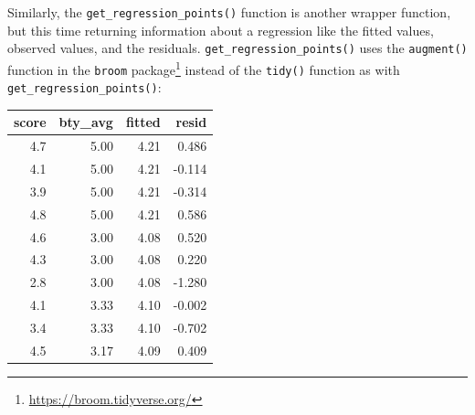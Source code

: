 \documentclass[12pt, krantz2,]{krantz}
\makeatletter
\newenvironment{Shaded}{\begin{snugshade}}{\end{snugshade}}
\newcommand{\DataTypeTok}[1]{\textcolor[rgb]{0.27,0.27,0.27}{#1}}
\newcommand{\DecValTok}[1]{\textcolor[rgb]{0.06,0.06,0.06}{#1}}
\newcommand{\KeywordTok}[1]{\textcolor[rgb]{0.27,0.27,0.27}{\textbf{#1}}}
\newcommand{\NormalTok}[1]{#1}
\newcommand{\OperatorTok}[1]{\textcolor[rgb]{0.43,0.43,0.43}{\textbf{#1}}}
\newcommand{\StringTok}[1]{\textcolor[rgb]{0.5,0.5,0.5}{#1}}
\renewcommand{\href}[2]{#2\footnote{\url{#1}}}
\newenvironment{kframe}{%
\medskip{}
\setlength{\fboxsep}{.8em}
 \def\at@end@of@kframe{}%
 \ifinner\ifhmode%
  \def\at@end@of@kframe{\end{minipage}}%
  \begin{minipage}{\columnwidth}%
 \fi\fi%
 \def\FrameCommand##1{\hskip\@totalleftmargin \hskip-\fboxsep
 \colorbox{shadecolor}{##1}\hskip-\fboxsep
     \hskip-\linewidth \hskip-\@totalleftmargin \hskip\columnwidth}%
 \MakeFramed {\advance\hsize-\width
   \@totalleftmargin\z@ \linewidth\hsize
   \@setminipage}}%
 {\par\unskip\endMakeFramed%
 \at@end@of@kframe}
\renewenvironment{Shaded}{\begin{kframe}}{\end{kframe}}
\makeatother
\begin{document}
Similarly, the \texttt{get\_regression\_points()} function is another wrapper function, but this time returning information about a regression like the fitted values, observed values, and the residuals. \texttt{get\_regression\_points()} uses the \texttt{augment()} function in the \href{https://broom.tidyverse.org/}{\texttt{broom} package} instead of the \texttt{tidy()} function as with \texttt{get\_regression\_points()}:

\begin{Shaded}
\end{Shaded}

\begin{table}[H]
\centering\begingroup\fontsize{10}{12}\selectfont

\begin{tabular}{r|r|r|r}
\hline
score & bty\_avg & fitted & resid\\
\hline
4.7 & 5.00 & 4.21 & 0.486\\
\hline
4.1 & 5.00 & 4.21 & -0.114\\
\hline
3.9 & 5.00 & 4.21 & -0.314\\
\hline
4.8 & 5.00 & 4.21 & 0.586\\
\hline
4.6 & 3.00 & 4.08 & 0.520\\
\hline
4.3 & 3.00 & 4.08 & 0.220\\
\hline
2.8 & 3.00 & 4.08 & -1.280\\
\hline
4.1 & 3.33 & 4.10 & -0.002\\
\hline
3.4 & 3.33 & 4.10 & -0.702\\
\hline
4.5 & 3.17 & 4.09 & 0.409\\
\hline
\end{tabular}
\endgroup{}
\end{table}
\end{document}
